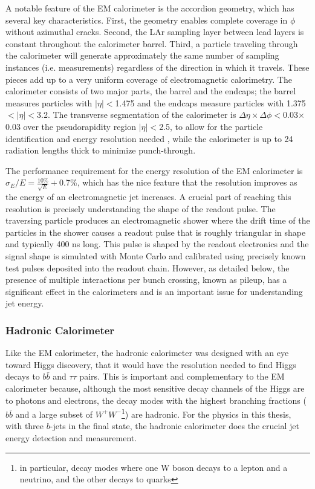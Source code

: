 A notable feature of the EM calorimeter is the accordion geometry, which has several key characteristics.  First, 
the geometry enables complete coverage in $\phi$ without azimuthal cracks.  Second, the LAr sampling layer between 
lead layers is constant throughout the calorimeter barrel.  Third, a particle traveling through the calorimeter will generate approximately 
the same number of sampling instances (i.e. measurements) regardless of the direction in which it 
travels.  These pieces add up to a very uniform coverage of electromagnetic calorimetry.  The calorimeter consists of two 
major parts, the barrel and the endcaps; the barrel measures particles with $|\eta|<$1.475 
and the endcaps measure particles with 1.375$<|\eta|<$3.2.  The transverse segmentation of the calorimeter
is $\Delta\eta \times \Delta\phi<$0.03$\times$ 0.03 over the pseudorapidity region $|\eta|<$2.5,  
to allow for the particle identification and energy resolution needed \cite{cal_tdr}, while the 
calorimeter is up to 24 radiation lengths thick to minimize punch-through.

The performance requirement for the energy resolution of the EM calorimeter is 
$\sigma_E/E=\frac{10\%}{\sqrt{E}}+$0.7\%, which has the nice feature that the resolution improves
as the energy of an electromagnetic jet increases.
A crucial part of reaching this resolution is precisely understanding the shape of the readout pulse.  The traversing particle 
produces an electromagnetic shower where the drift time of the particles in the shower causes a readout pulse that is 
roughly triangular in shape and typically 400 ns long.  This pulse is shaped by the readout electronics and the 
signal shape is simulated with Monte Carlo and calibrated using precisely known test pulses deposited into the readout chain.  
However, as detailed below, the presence of multiple interactions per bunch crossing, known as pileup, has 
a significant effect in the calorimeters and is an important issue for understanding jet energy.

\subsubsection{Hadronic Calorimeter} 
\label{sec:h_cal}
Like the EM calorimeter, the hadronic calorimeter was designed with an eye toward Higgs discovery, that it would
have the resolution needed to find Higgs decays to $b\bar{b}$ and $\tau\tau$ pairs.  This is important and complementary
to the EM calorimeter because, although the most sensitive decay channels of the Higgs are to photons and electrons,
the decay modes with the highest branching fractions ($b\bar{b}$ and a large subset of $W^+W^-$\footnote{in particular,
decay modes where one W boson decays to a lepton and a neutrino, and the other decays to quarks}) are hadronic.
For the physics in this thesis, with three $b$-jets in the final state, the hadronic calorimeter does the crucial
jet energy detection and measurement. 

